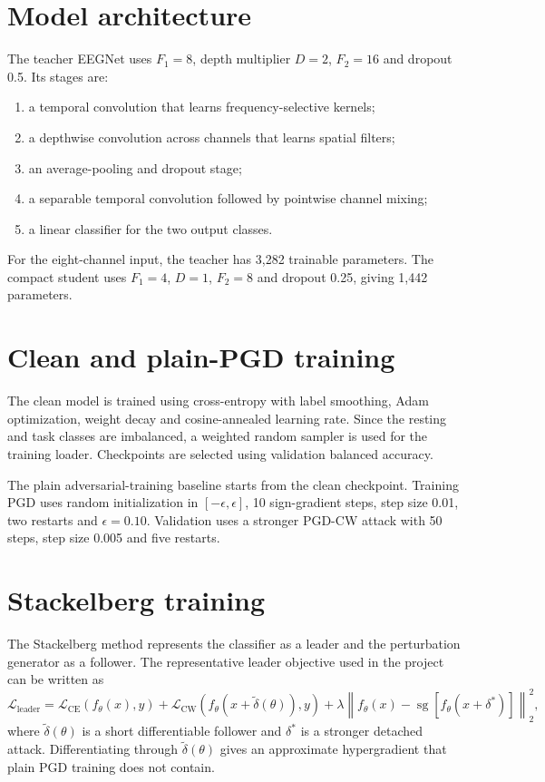 \documentclass[10pt,a4paper,openright]{report}
\newcommand{\sg}{\operatorname{sg}}
\begin{document}
\section{Model architecture}
The teacher EEGNet uses $F_1=8$, depth multiplier $D=2$, $F_2=16$ and dropout 0.5. Its stages are:
\begin{enumerate}
\item a temporal convolution that learns frequency-selective kernels;
\item a depthwise convolution across channels that learns spatial filters;
\item an average-pooling and dropout stage;
\item a separable temporal convolution followed by pointwise channel mixing;
\item a linear classifier for the two output classes.
\end{enumerate}
For the eight-channel input, the teacher has 3,282 trainable parameters. The compact student uses $F_1=4$, $D=1$, $F_2=8$ and dropout 0.25, giving 1,442 parameters.

\section{Clean and plain-PGD training}
The clean model is trained using cross-entropy with label smoothing, Adam optimization, weight decay and cosine-annealed learning rate. Since the resting and task classes are imbalanced, a weighted random sampler is used for the training loader. Checkpoints are selected using validation balanced accuracy.

The plain adversarial-training baseline starts from the clean checkpoint. Training PGD uses random initialization in $[-\epsilon,\epsilon]$, 10 sign-gradient steps, step size 0.01, two restarts and $\epsilon=0.10$. Validation uses a stronger PGD-CW attack with 50 steps, step size 0.005 and five restarts.

\section{Stackelberg training}
The Stackelberg method represents the classifier as a leader and the perturbation generator as a follower. The representative leader objective used in the project can be written as
\begin{equation}
\mathcal{L}_{\mathrm{leader}}=
\mathcal{L}_{\mathrm{CE}}(f_\theta(x),y)
+\mathcal{L}_{\mathrm{CW}}(f_\theta(x+\widetilde{\delta}(\theta)),y)
+\lambda\left\|f_\theta(x)-\sg\left[f_\theta(x+\delta^*)\right]\right\|_2^2,
\end{equation}
where $\widetilde{\delta}(\theta)$ is a short differentiable follower and $\delta^*$ is a stronger detached attack. Differentiating through $\widetilde{\delta}(\theta)$ gives an approximate hypergradient that plain PGD training does not contain.
\end{document}
